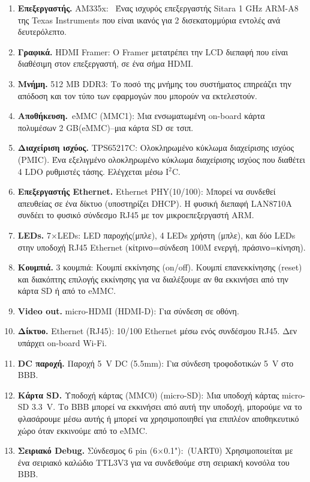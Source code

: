 \documentclass[12pt, a4paper, oneside]{report}
\begin{document}
\begin{enumerate}
\item {\large\textbf{Επεξεργαστής.}} AM335x:~ Ένας ισχυρός επεξεργαστής Sitara 1 GHz ARM-A8 της Texas Instruments που είναι ικανός για 2 δισεκατομμύρια εντολές ανά δευτερόλεπτο.
\item {\large\textbf{Γραφικά.}} HDMI Framer: Ο Framer μετατρέπει την LCD διεπαφή που είναι διαθέσιμη στον επεξεργαστή, σε ένα σήμα HDMI.
\item {\large\textbf{Μνήμη.}} 512 MB DDR3: Το ποσό της μνήμης του συστήματος επηρεάζει την απόδοση και τον τύπο των εφαρμογών που μπορούν να εκτελεστούν.
\item {\large\textbf{Αποθήκευση.}}~\phantom{k}eMMC (MMC1): Μια ενσωματωμένη on-board κάρτα πολυμέσων 2 GB(eMMC)--μια κάρτα SD σε τσιπ.
\item {\large\textbf{Διαχείριση ισχύος.}} TPS65217C: Ολοκληρωμένο κύκλωμα διαχείρισης ισχύος (PMIC). Ένα εξελιγμένο ολοκληρωμένο κύκλωμα διαχείρισης ισχύος που διαθέτει 4 LDO ρυθμιστές τάσης. Ελέγχεται μέσω I$^2$C.
\item {\large\textbf{Επεξεργαστής Ethernet.}} Ethernet PHY(10\slash100): Μπορεί να συνδεθεί απευθείας σε ένα δίκτυο (υποστηρίζει DHCP). Η φυσική διεπαφή LAN8710A συνδέει το φυσικό σύνδεσμο RJ45 με τον μικροεπεξεργαστή ARM.
\item {\large\textbf{LEDs.}} 7$\times$LEDs: LED παροχής(μπλε), 4 LEDs χρήστη (μπλε), και δύο LEDs στην υποδοχή RJ45 Ethernet (κίτρινο=σύνδεση 100M ενεργή, πράσινο=κίνηση).
\item {\large\textbf{Κουμπιά.}} 3 κουμπιά: Κουμπί εκκίνησης (on\slash off). Κουμπί επανεκκίνησης (reset) και διακόπτης επιλογής εκκίνησης για να διαλέξουμε αν θα εκκινήσει από την κάρτα SD ή από το eMMC.
\item {\large\textbf{Video out.}} micro-HDMI (HDMI-D): Για σύνδεση σε οθόνη.
\item {\large\textbf{Δίκτυο.}} Ethernet (RJ45): 10\slash100 Ethernet μέσω ενός συνδέσμου RJ45. Δεν υπάρχει on-board Wi-Fi.
\item {\large\textbf{DC παροχή.}} Παροχή 5~V DC (5.5mm): Για σύνδεση τροφοδοτικών 5~V στο BBB.
\item {\large\textbf{Κάρτα SD.}} Υποδοχή κάρτας (MMC0) (micro-SD): Μια υποδοχή κάρτας micro-SD 3.3~V. Το BBB μπορεί να εκκινήσει από αυτή την υποδοχή, μπορούμε να το φλασάρουμε μέσω αυτής ή μπορεί να χρησιμοποιηθεί για επιπλέον αποθηκευτικό χώρο όταν εκκινούμε από το eMMC.
\item {\large\textbf{Σειριακό Debug.}} Σύνδεσμος 6 pin (6$\times$0.1"):~(UART0) Χρησιμοποιείται με ένα σειριακό καλώδιο TTL3V3 για να συνδεθούμε στη σειριακή κονσόλα του BBB.\label{deb}

\end{enumerate}
\end{document}
